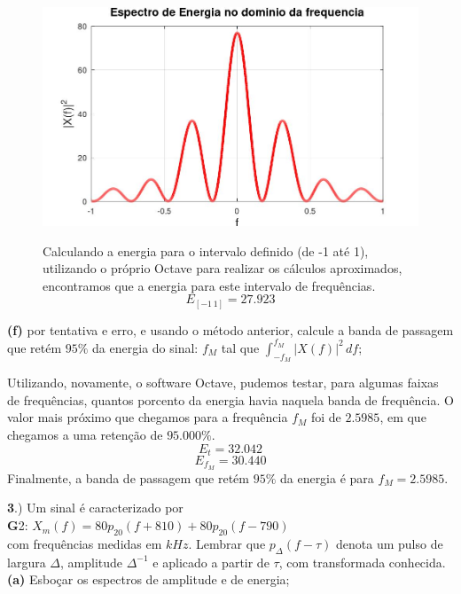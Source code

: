 \documentclass[10pt, a4paper]{article}
\begin{document}
\begin{figure}[h]
    \begin{minipage}[!]{0.50\linewidth}
        \includegraphics[scale=0.27]{plot2e.jpg}        
    \end{minipage}
    \begin{minipage}[!]{0.48\linewidth}
        Calculando a energia para o intervalo definido (de -1 até 1), utilizando o próprio Octave para realizar os cálculos aproximados, encontramos que a energia para este intervalo de frequências.
        \[E_{[-1\,1]} = 27.923\]        
    \end{minipage}
\end{figure}

\newpage

{\textbf{(f)}} por tentativa e erro, e usando o método anterior, calcule a banda de passagem que retém $95\%$ da energia do sinal: $f_{M}$ tal que $\int_{-f_{M}}^{f_{M}} |X(f)|^{2}\,df$;

Utilizando, novamente, o software Octave, pudemos testar, para algumas faixas de frequências, quantos porcento da energia havia naquela banda de frequência. O valor mais próximo que chegamos para a frequência $f_{M}$ foi de $2.5985$, em que chegamos a uma retenção de $95.000\%$.
\[E_{t} = 32.042\]
\[E_{f_{M}} = 30.440\]
Finalmente, a banda de passagem que retém $95\%$ da energia é para $f_{M} = 2.5985$.

\vspace{\baselineskip}

{\textbf 3.)} Um sinal é caracterizado por\\
{\textbf G2:} $ X_{m}(f) = 80p_{20}(f + 810) + 80p_{20}(f - 790) $\\
com frequências medidas em $kHz$. Lembrar que $p_{\Delta}(f - \tau)$ denota um pulso de largura $\Delta$, amplitude $\Delta^{-1}$ e aplicado a partir de $\tau$, com transformada conhecida.\\
{\textbf{(a)}} Esboçar os espectros de amplitude e de energia;
\end{document}

